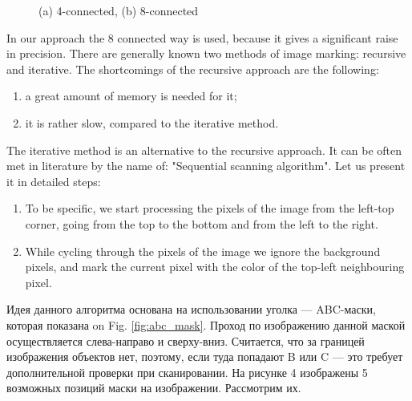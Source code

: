 \documentclass[12pt,a4paper,oneside,titlepage]{article}
\begin{document}
\begin{figure}[h]
\begin{minipage}[h]{0.49\linewidth}
\end{minipage}
\hfill
\begin{minipage}[h]{0.49\linewidth}
\end{minipage}
\caption{(a) 4-connected, (b) 8-connected}
\label{ris:connections}
\end{figure}



In our approach the 8 connected way is used, because it gives a significant raise in precision.
There are generally known two methods of image marking: recursive and iterative.
The shortcomings of the recursive approach are the following:
\begin{enumerate}
  \item a great amount of memory is needed for it;
  \item it is rather slow, compared to the iterative method.
\end{enumerate}
The iterative method is an alternative to the recursive approach. It can be often met in literature by the name of: "Sequential scanning algorithm".
Let us present it in detailed steps:

\begin{enumerate}
  \item To be specific, we start processing the pixels of the image from the left-top corner, going from the top to the bottom and from the left to the right.
  \item While cycling through the pixels of the image we ignore the background pixels, and mark the current pixel with the color of the top-left neighbouring pixel.
\end{enumerate}

Идея данного алгоритма основана на использовании уголка — ABC-маски, которая показана on Fig. \ref{fig:abc_mask}.
Проход по изображению данной маской осуществляется слева-направо и сверху-вниз. Считается, что за границей изображения объектов нет, поэтому, если туда попадают B или C — это требует дополнительной проверки при сканировании. На рисунке 4 изображены 5 возможных позиций маски на изображении.
Рассмотрим их.
\end{document}
